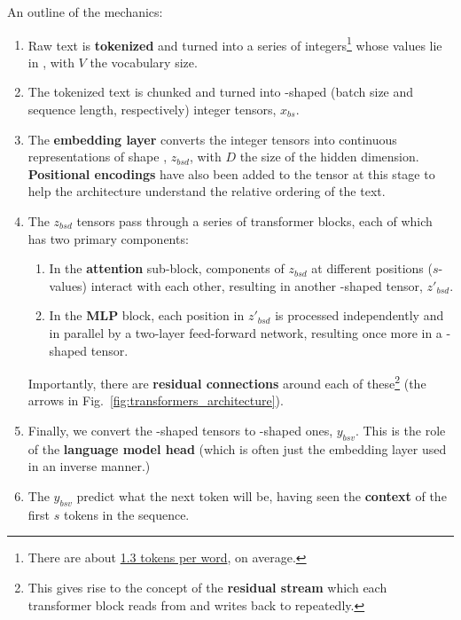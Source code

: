 \documentclass[11pt]{article}
\begin{document}
An outline of the mechanics:
\begin{enumerate}
    \item Raw text is \textbf{tokenized} and turned into a series of integers\footnote{There are
        about \href{https://github.com/ray-project/llm-numbers#131----average-tokens-per-word}{1.3 tokens per word}, on average.} whose values lie in , with $ V $ the vocabulary
        size.
    \item The tokenized text is chunked and turned into -shaped (batch size and
        sequence length, respectively) integer tensors, $ x _{ bs } $.
    \item The \textbf{embedding layer} converts the integer tensors into continuous representations of shape
        , $ z _{ bsd } $, with $ D $ the size of the hidden dimension.
        \textbf{Positional encodings} have also been added to the tensor at this stage to help the
        architecture understand the relative ordering of the text.
    \item The $ z _{ bsd } $ tensors pass through a series of transformer blocks, each of which has
        two primary components:
        \begin{enumerate}
        \item In the \textbf{attention} sub-block, components of $ z _{ bsd } $ at different
            positions ($ s $-values) interact with each other, resulting in another -shaped
            tensor, $  z' _{ bsd } $.
        \item In the \textbf{MLP} block, each position in  $ z' _{ bsd } $ is processed
            independently and in parallel by a two-layer feed-forward network, resulting once more
            in a -shaped tensor.
        \end{enumerate}
        Importantly, there are \textbf{residual connections} around each of these\footnote{This
        gives rise to the concept of the \textbf{residual stream} which each transformer block reads
        from and writes back to repeatedly.} (the arrows in Fig.~\ref{fig:transformers_architecture}).
    \item Finally, we convert the -shaped
        tensors to -shaped ones, $ y _{ bsv } $. This is the role of
        the \textbf{language model head} (which is often just the embedding layer used in an inverse
        manner.)
    \item  The $ y _{ bsv } $ predict what the next token will be, having seen the \textbf{context}
        of the first $ s $ tokens in the sequence.
\end{enumerate}
\end{document}
